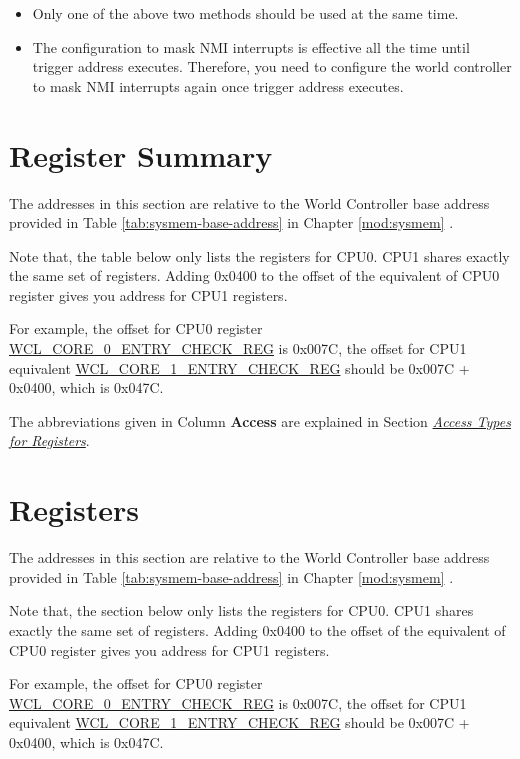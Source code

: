\documentclass[main\_\_EN.tex]{subfiles}
\begin{document}
\begin{tiplisting}
\vspace{-2em}
 \begin{itemize}
    \item Only one of the above two methods should be used at the same time.
    \item The configuration to mask NMI interrupts is effective all the time until trigger address executes. Therefore, you need to configure the world controller to mask NMI interrupts again once trigger address executes.
 \end{itemize}
\end{tiplisting}

\clearpage

\section{Register Summary}\hypertarget{wctrl-reg-summ}{}
The addresses in this section are relative to the World Controller base address provided in Table \ref{tab:sysmem-base-address} in Chapter \ref{mod:sysmem} \textit{}.

Note that, the table below only lists the registers for CPU0. CPU1 shares exactly the same set of registers. Adding 0x{}0400 to the offset of the equivalent of CPU0 register gives you address for CPU1 registers.

For example, the offset for CPU0 register \hyperref[regdesc:WCLCORE0ENTRYCHECKREG]{WCL\_CORE\_0\_ENTRY\_CHECK\_REG} is 0x{}007C, the offset for CPU1 equivalent \hyperref[regdesc:WCLCORE0ENTRYCHECKREG]{WCL\_CORE\_1\_ENTRY\_CHECK\_REG} should be 0x{}007C + 0x{}0400, which is 0x{}047C.

The abbreviations given in Column \textbf{Access} are explained in Section \hyperref[glossary-access-types]{\textit{Access Types for Registers}}.




\clearpage

\section{Registers}

The addresses in this section are relative to the World Controller base address provided in Table \ref{tab:sysmem-base-address} in Chapter \ref{mod:sysmem} \textit{}.

Note that, the section below only lists the registers for CPU0. CPU1 shares exactly the same set of registers. Adding 0x{}0400 to the offset of the equivalent of CPU0 register gives you address for CPU1 registers.

For example, the offset for CPU0 register \hyperref[regdesc:WCLCORE0ENTRYCHECKREG]{WCL\_CORE\_0\_ENTRY\_CHECK\_REG} is 0x{}007C, the offset for CPU1 equivalent \hyperref[regdesc:WCLCORE0ENTRYCHECKREG]{WCL\_CORE\_1\_ENTRY\_CHECK\_REG} should be 0x{}007C + 0x{}0400, which is 0x{}047C.


\end{document}
